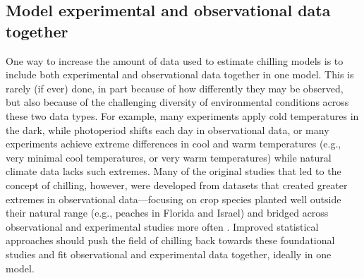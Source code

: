 \documentclass[11pt]{article}
\begin{document}
\subsection*{Model experimental and observational data together} 

One way to increase the amount of data used to estimate chilling models is to include both experimental and observational data together in one model. This is rarely (if ever) done, in part because of how differently they may be observed, but also because of the challenging diversity of environmental conditions across these two data types. 
For example, many experiments apply cold temperatures in the dark, while photoperiod shifts each day in observational data, or many experiments achieve extreme differences in cool and warm temperatures (e.g., very minimal cool temperatures, or very warm temperatures) while natural climate data lacks such extremes. Many of the original studies that led to the concept of chilling, however, were developed from datasets that created greater extremes in observational data---focusing on crop species planted well outside their natural range (e.g., peaches in Florida and Israel) and bridged across observational and experimental studies more often \citep{erez1971,richardson1974}. Improved statistical approaches should push the field of chilling back towards these foundational studies and fit observational and experimental data together, ideally in one model.  
\end{document}
